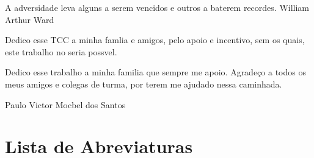 \documentclass{./public/ufpatcc}
\begin{document}
\begin{ufpaEpigrafe}
A adversidade leva alguns a serem vencidos e
 outros a baterem recordes. William Arthur Ward
\end{ufpaEpigrafe}

\ufpaPaginaDeAprovacao

\begin{ufpaOferecimento}
    Dedico esse TCC a minha famlia e amigos, pelo apoio e incentivo,
    sem os quais, este trabalho no seria possvel.
\end{ufpaOferecimento}

\begin{ufpaAgradecimentos}

		Dedico esse trabalho a minha familia que sempre me apoio. Agradeço a todos os meus amigos e colegas de turma, por terem me ajudado nessa caminhada.

    \begin{flushright}
        Paulo Victor Mocbel dos Santos
    \end{flushright}

\end{ufpaAgradecimentos}

\tableofcontents    \clearpage

\listoffigures \clearpage \listoftables \clearpage

\chapter*{Lista de Abreviaturas}
\end{document}
